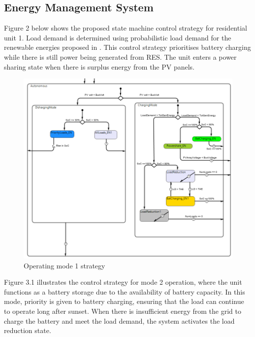 \subsection{Energy Management System}
Figure 2 below shows the proposed state machine control strategy for residential unit 1. Load demand is determined using probabilistic load demand for the renewable energies proposed in \cite{39} . This control strategy prioritises battery charging while there is still power being generated from RES. The unit enters a power sharing state when there is surplus energy from the PV panels.\par
\begin{figure}[H]
	\centering
	\includegraphics[totalheight=12cm]{Figures/opmod1 strategy.png}
	\caption{Operating mode 1 strategy}
\end{figure}
Figure 3.1 illustrates the control strategy for mode 2 operation, where the unit functions as a battery storage due to the availability of battery capacity. In this mode, priority is given to battery charging, ensuring that the load can continue to operate long after sunset. When there is insufficient energy from the grid to charge the battery and meet the load demand, the system activates the load reduction state.\par
